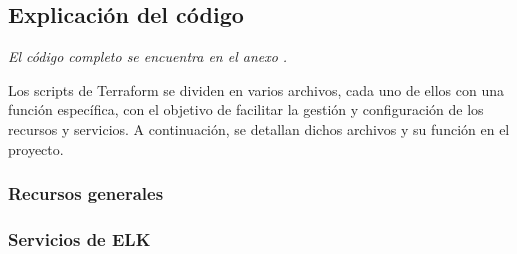\newpage{}
\subsection{Explicación del código}\label{sec:impl_configuracion}
\emph{El código completo se encuentra en el anexo .}

Los scripts de Terraform se dividen en varios archivos, cada uno de ellos con
una función específica, con el objetivo de facilitar la gestión y configuración
de los recursos y servicios. A continuación, se detallan dichos archivos y su
función en el proyecto.


\subsubsection{Recursos generales}


\subsubsection{Servicios de ELK}
